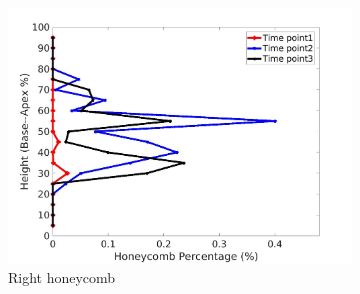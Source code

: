 \begin{figure}[H]
\begin{subfigure}{.42\linewidth}
  \includegraphics[width=\linewidth,trim={{.0\wd0} {.0\wd0} {.0\wd0} {.0\wd0}},clip]{QuantitativeAnalysis/Image/IPF21RightLungHoneycombDiseaseAgainstHeight.jpg}
  \caption{Right honeycomb}
  \label{fig:IPF21DiseaseAgainstHeightMain-f}
\end{subfigure}
\begin{subfigure}{.42\linewidth}%

\end{subfigure}
\end{figure}
